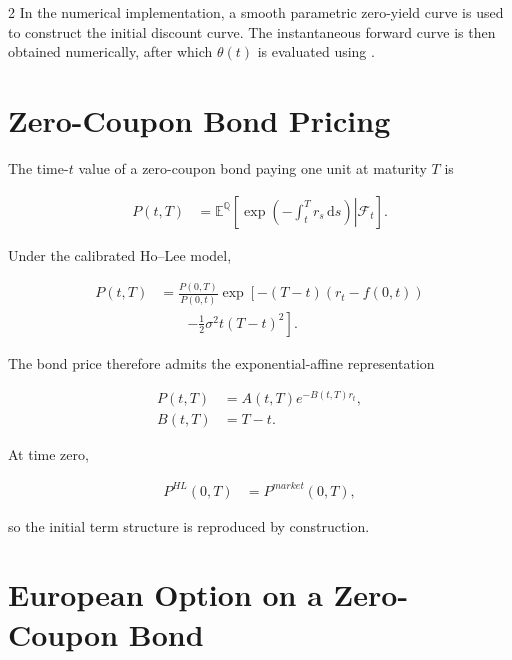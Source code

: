 \documentclass[10pt,a4paper]{article}
\newcommand{\E}{\mathbb{E}}
\newcommand{\Q}{\mathbb{Q}}
\newcommand{\dd}{\,\mathrm{d}}
\numberwithin{equation}{section}
\begin{document}
\begin{multicols}{2}
In the numerical implementation, a smooth parametric zero-yield curve is
used to construct the initial discount curve. The instantaneous forward
curve is then obtained numerically, after which $\theta(t)$ is evaluated
using .

\section{Zero-Coupon Bond Pricing}

The time-$t$ value of a zero-coupon bond paying one unit at maturity $T$
is

\begin{align*}
    P(t,T)
    &=
    \E^{\Q}
    \left[
        \left.
        \exp
        \left(
            -\int_t^T r_s\dd s
        \right)
        \right|
        \mathcal{F}_t
    \right].
\end{align*}

Under the calibrated Ho--Lee model,

\begin{align*}
    P(t,T)
    &=
    \frac{P(0,T)}{P(0,t)}
    \exp
    \left[
        -(T-t)(r_t-f(0,t))
    \right.
    \\
    &\qquad\left.
        -\frac{1}{2}\sigma^2t(T-t)^2
    \right].
\end{align*}

The bond price therefore admits the exponential-affine representation

\begin{align*}
    P(t,T)
    &=
    A(t,T)e^{-B(t,T)r_t},
    \\
    B(t,T)
    &=
    T-t.
\end{align*}

At time zero,

\begin{align*}
    P^{HL}(0,T)
    &=
    P^{market}(0,T),
\end{align*}

so the initial term structure is reproduced by construction.

\section{European Option on a Zero-Coupon Bond}


\end{multicols}
\end{document}
